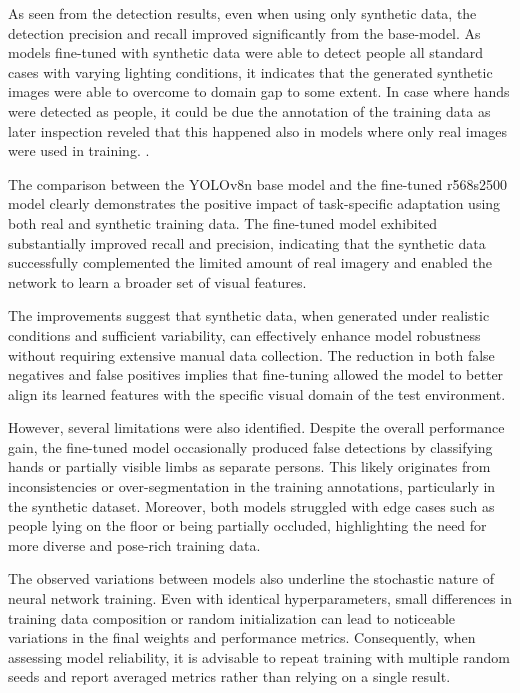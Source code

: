As seen from the detection results, even when using only synthetic data, the detection precision and recall improved significantly from the base-model. As models fine-tuned with synthetic data were able to detect people all standard cases with varying lighting conditions, it indicates that the generated synthetic images were able to overcome to domain gap to some extent. In case where hands were detected as people, it could be due the annotation of the training data as later inspection reveled that this happened also in models where only real images were used in training.
.



The comparison between the YOLOv8n base model and the fine-tuned r568s2500 model clearly demonstrates the positive impact of task-specific adaptation using both real and synthetic training data. The fine-tuned model exhibited substantially improved recall and precision, indicating that the synthetic data successfully complemented the limited amount of real imagery and enabled the network to learn a broader set of visual features.

The improvements suggest that synthetic data, when generated under realistic conditions and sufficient variability, can effectively enhance model robustness without requiring extensive manual data collection. The reduction in both false negatives and false positives implies that fine-tuning allowed the model to better align its learned features with the specific visual domain of the test environment.

However, several limitations were also identified. Despite the overall performance gain, the fine-tuned model occasionally produced false detections by classifying hands or partially visible limbs as separate persons. This likely originates from inconsistencies or over-segmentation in the training annotations, particularly in the synthetic dataset. Moreover, both models struggled with edge cases such as people lying on the floor or being partially occluded, highlighting the need for more diverse and pose-rich training data.

The observed variations between models also underline the stochastic nature of neural network training. Even with identical hyperparameters, small differences in training data composition or random initialization can lead to noticeable variations in the final weights and performance metrics. Consequently, when assessing model reliability, it is advisable to repeat training with multiple random seeds and report averaged metrics rather than relying on a single result.

